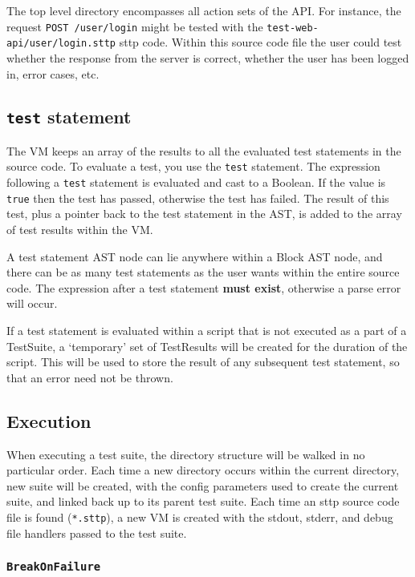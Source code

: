 The top level directory encompasses all action sets of the API. For instance, the request \verb|POST /user/login| might be tested with the \verb|test-web-api/user/login.sttp| sttp code. Within this source code file the user could test whether the response from the server is correct, whether the user has been logged in, error cases, etc.

\cprotect\subsection{\verb|test| statement}

The VM keeps an array of the results to all the evaluated test statements in the source code. To evaluate a test, you use the \verb|test| statement. The expression following a \verb|test| statement is evaluated and cast to a Boolean. If the value is \verb|true| then the test has passed, otherwise the test has failed. The result of this test, plus a pointer back to the test statement in the AST, is added to the array of test results within the VM.

A test statement AST node can lie anywhere within a Block AST node, and there can be as many test statements as the user wants within the entire source code. The expression after a test statement \textbf{must exist}, otherwise a parse error will occur.

If a test statement is evaluated within a script that is not executed as a part of a TestSuite, a `temporary' set of TestResults will be created for the duration of the script. This will be used to store the result of any subsequent test statement, so that an error need not be thrown.

\subsection{Execution}

When executing a test suite, the directory structure will be walked in no particular order. Each time a new directory occurs within the current directory, new suite will be created, with the config parameters used to create the current suite, and linked back up to its parent test suite. Each time an sttp source code file is found (\verb|*.sttp|), a new VM is created with the stdout, stderr, and debug file handlers passed to the test suite.

\cprotect\subsubsection{\verb|BreakOnFailure|}

